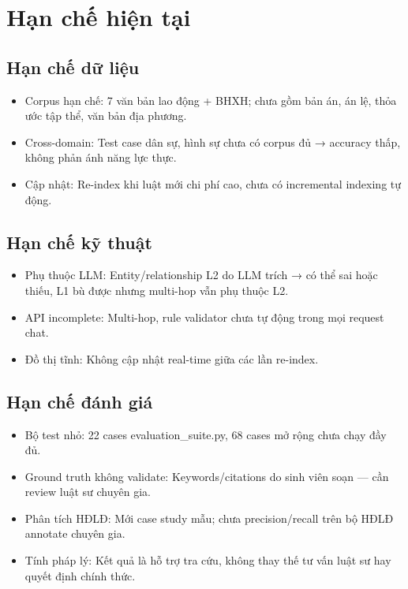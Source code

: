 \documentclass[../DoAn.tex]{subfiles}
\begin{document}
\section{Hạn chế hiện tại}
\label{section:6.3}

\subsection{Hạn chế dữ liệu}
\label{subsection:6.3.1}

\begin{itemize}[nosep, leftmargin=*]
    \item Corpus hạn chế: 7 văn bản lao động + BHXH; chưa gồm bản án, án lệ, thỏa ước tập thể, văn bản địa phương.
    
    \item Cross-domain: Test case dân sự, hình sự chưa có corpus đủ → accuracy thấp, không phản ánh năng lực thực.
    
    \item Cập nhật: Re-index khi luật mới chi phí cao, chưa có incremental indexing tự động.
\end{itemize}

\subsection{Hạn chế kỹ thuật}
\label{subsection:6.3.2}

\begin{itemize}[nosep, leftmargin=*]
    \item Phụ thuộc LLM: Entity/relationship L2 do LLM trích → có thể sai hoặc thiếu, L1 bù được nhưng multi-hop vẫn phụ thuộc L2.
    
    \item API incomplete: Multi-hop, rule validator chưa tự động trong mọi request chat.
    
    \item Đồ thị tĩnh: Không cập nhật real-time giữa các lần re-index.
\end{itemize}

\subsection{Hạn chế đánh giá}
\label{subsection:6.3.3}

\begin{itemize}[nosep, leftmargin=*]
    \item Bộ test nhỏ: 22 cases evaluation\_suite.py, 68 cases mở rộng chưa chạy đầy đủ.
    
    \item Ground truth không validate: Keywords/citations do sinh viên soạn --- cần review luật sư chuyên gia.
    
    \item Phân tích HĐLĐ: Mới case study mẫu; chưa precision/recall trên bộ HĐLĐ annotate chuyên gia.
    
    \item Tính pháp lý: Kết quả là hỗ trợ tra cứu, không thay thế tư vấn luật sư hay quyết định chính thức.
\end{itemize}
\end{document}
